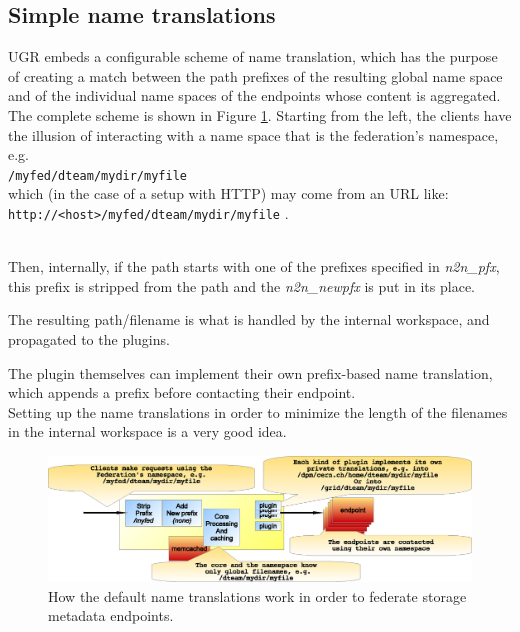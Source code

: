 \documentclass[12pt]{article} %
\begin{document}
\subsection{Simple name translations}

UGR embeds a configurable scheme of name translation, which has the purpose of creating a match between the path prefixes of the resulting global name space and of the individual name spaces of the endpoints whose content is aggregated.\\
The complete scheme is shown in Figure \ref{fig_n2n}. Starting from the left, the clients have the illusion of interacting with a name space that is the federation's namespace, e.g.\\

\lstinline{/myfed/dteam/mydir/myfile}\\
 
 which (in the case of a setup with HTTP) may come from an URL like:\\
 
 \lstinline"http://<host>/myfed/dteam/mydir/myfile" .\\\
 
 Then, internally, if the path starts with one of the prefixes specified in \textit{n2n\_pfx}, this prefix is stripped from the path and the \textit{n2n\_newpfx} is put in its place.
 
 The resulting path/filename is what is handled by the internal workspace, and propagated to the plugins.
 
  The plugin themselves can implement their own prefix-based name translation, which appends a prefix before contacting their endpoint.\\
  
 Setting up the name translations in order to minimize the length of the filenames in the internal workspace is a very good idea.\\





\begin{figure}
  \begin{center}
    \includegraphics[width=36pc]{n2n.eps}
  \end{center}
  \caption{\label{fig_n2n}How the default name translations work in order to federate storage metadata endpoints.}
\end{figure}
\end{document}
